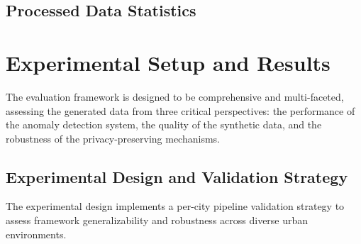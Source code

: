 \documentclass[runningheads]{llncs}
\begin{document}
\subsection{Processed Data Statistics}
\label{sec:processed-data}

\begin{compactoutline}
\end{compactoutline}

\section{Experimental Setup and Results}
\label{sec:evaluation}

The evaluation framework is designed to be comprehensive and multi-faceted, assessing the generated data from three critical perspectives: the performance of the anomaly detection system, the quality of the synthetic data, and the robustness of the privacy-preserving mechanisms.

\subsection{Experimental Design and Validation Strategy}
\label{sec:exp-design}

The experimental design implements a per-city pipeline validation strategy to assess framework generalizability and robustness across diverse urban environments.
\end{document}
